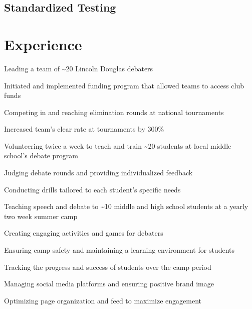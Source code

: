 \documentclass[letterpaper]{resume-shreeram}
\begin{document}
\subsection{Standardized Testing}



\section{Experience}

\begin{compactitem}
    \item Leading a team of \textasciitilde{}20 Lincoln Douglas debaters
    \item Initiated and implemented funding program that allowed teams to access club funds
    \item Competing in and reaching elimination rounds at national tournaments
    \item Increased team's clear rate at tournaments by 300\%
\end{compactitem}

\begin{compactitem}
    \item Volunteering twice a week to teach and train \textasciitilde{}20 students at local middle school's debate program
    \item Judging debate rounds and providing individualized feedback
    \item Conducting drills tailored to each student's specific needs
\end{compactitem}

\begin{compactitem}
    \item Teaching speech and debate to \textasciitilde{}10 middle and high school students at a yearly two week summer camp
    \item Creating engaging activities and games for debaters
    \item Ensuring camp safety and maintaining a learning environment for students
    \item Tracking the progress and success of students over the camp period
\end{compactitem}

\begin{compactitem}
    \item Managing social media platforms and ensuring positive brand image
    \item Optimizing page organization and feed to maximize engagement
\end{compactitem}
\end{document}
